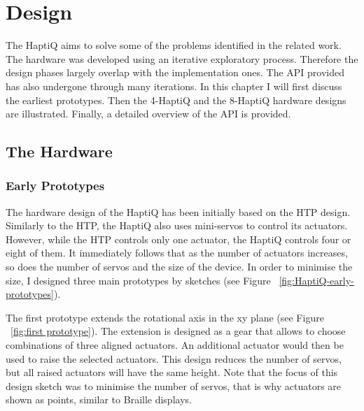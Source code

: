 \chapter{Design}

The HaptiQ aims to solve some of the problems identified in the related work. The hardware was developed using an iterative exploratory process. Therefore the design phases largely overlap with the implementation ones. The API provided has also undergone through many iterations. In this chapter I will first discuss the earliest prototypes. Then the 4-HaptiQ and the 8-HaptiQ hardware designs are illustrated. Finally, a detailed overview of the API is provided.

\section{The Hardware}
\subsection{Early Prototypes}
The hardware design of the HaptiQ has been initially based on the HTP design. Similarly to the HTP, the HaptiQ also uses mini-servos to control its actuators. However, while the HTP controls only one actuator, the HaptiQ controls four or eight of them. It immediately follows that as the number of actuators increases, so does the number of servos and the size of the device. In order to minimise the size, I designed three main prototypes by sketches (see Figure ~\ref{fig:HaptiQ-early-prototypes}). 

The first prototype extends the rotational axis in the xy plane (see Figure ~\ref{fig:first prototype}). The extension is designed as a gear that allows to choose combinations of three aligned actuators. An additional actuator would then be used to raise the selected actuators. This design reduces the number of servos, but all raised actuators will have the same height. Note that the focus of this design sketch was to minimise the number of servos, that is why actuators are shown as points, similar to Braille displays.

